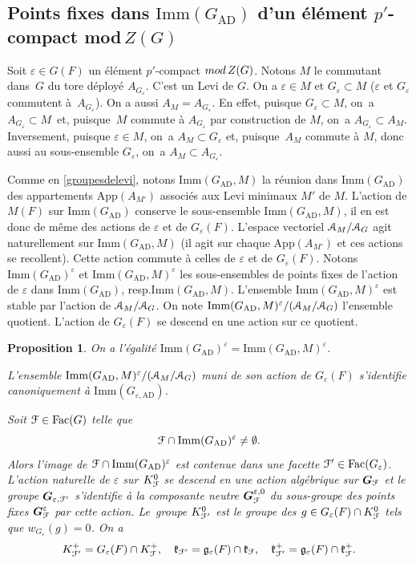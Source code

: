 \documentclass[11pt]{article}
\newcommand{\resp}{resp.\xspace}
\newcommand{\Subsection}{\subsection}
\newcommand{\skpt}{\smallskip}
\numberwithin{equation}{section}\providecommand{\og}{«\,}\providecommand{\fg}{\,»}
\let\mathcal \EuScript
\let\oldenumerate\enumerate
\renewcommand{\enumerate}{\oldenumerate\itemindent0pt}
\newenvironment{enumeratei}
{\bgroup\def\theenumi{\roman{enumi}}\def\theenumii{\arabic{enumii}}\oldenumerate}
{\endenumerate\egroup}
\let\epsilon\varepsilon
\newcommand{\rmod}{\textup{mod}\,}
\newcommand{\frg}{\mathfrak{g}}
\newcommand{\frk}{\mathfrak{k}}
\newcommand{\AD}{\mathrm{AD}}
\newcommand{\App}{\mathrm{App}}
\newcommand{\Fac}{\mathrm{Fac}}
\newcommand{\Imm}{\mathrm{Imm}}
\newcommand{\bG}{\boldsymbol{G}}
\newcommand{\cA}{\mathcal{A}}
\newcommand{\cF}{\mathcal{F}}
\theoremstyle{plain}
\newtheorem*{prop*}{Proposition}
\theoremstyle{definition}
\begin{document}
\Subsection{Points fixes dans \texorpdfstring{$\Imm(G_{\AD})$ d'un élément $p'$-compact mod\,$Z(G)$}{IGZG}}\label{pointsfixes}
Soit $\epsilon \in G(F)$ un élément $p'$-compact $\rmod Z(G)$. Notons $M$ le commutant dans~$G$ du tore déployé $A_{G_{\epsilon}}$. C'est un Levi de $G$. On a $\epsilon\in M$ et $G_{\epsilon}\subset M$ ($\epsilon$ et $G_{\epsilon}$ commutent à~$A_{G_{\epsilon}}$). On a aussi $A_{M}=A_{G_{\epsilon}}$. En effet, puisque $G_{\epsilon}\subset M$, on~a $ A_{G_{\epsilon}}\subset M$~et, puisque~$M$ commute à $A_{G_{\epsilon}}$ par construction de $M$, on~a $A_{G_{\epsilon}}\subset A_{M}$. Inversement, puisque $\epsilon\in M$, on~a $A_{M}\subset G_{\epsilon}$ et, puisque~$A_{M}$ commute à $M$, donc aussi au sous-ensemble $G_{\epsilon}$, on~a $A_{M}\subset A_{G_{\epsilon}}$.

Comme en \ref{groupesdelevi}, notons $\Imm(G_{\AD},M)$ la réunion dans $\Imm(G_{\AD})$ des appartements $\App(A_{M'})$ associés aux Levi minimaux $M'$ de $M$. L'action de $M(F)$ sur $\Imm(G_{\AD})$ conserve le sous-ensemble $\Imm(G_{\AD},M)$, il en est donc de même des actions de $\epsilon$ et de $G_{\epsilon}(F)$. L'espace vectoriel $\cA_{M} /\cA_{G}$ agit naturellement sur $\Imm(G_{\AD},M)$ (il agit sur chaque $\App(A_{M'})$ et ces actions se recollent). Cette action commute à celles de $\epsilon$ et de $G_{\epsilon}(F)$. Notons $\Imm(G_{\AD})^{\epsilon}$ et $\Imm(G_{\AD},M)^{\epsilon}$ les sous-ensembles de points fixes de l'action de $\epsilon$ dans $\Imm(G_{\AD})$, \resp $\Imm(G_{\AD},M)$. L'ensemble $\Imm(G_{\AD},M)^{\epsilon}$ est stable par l'action de $\cA_{M}/\cA_{G}$. On note $\Imm(G_{\AD},M)^{\epsilon}/(\cA_{M}/\cA_{G})$ l'ensemble quotient. L'action de $G_{\epsilon}(F)$ se descend en une action sur ce quotient.

\skpt
\begin{prop*}
\begin{enumeratei}
\item\label{pointsfixesi}
On a l'égalité $\Imm(G_{\AD})^{\epsilon}=\Imm(G_{\AD},M)^{\epsilon}$.

\item\label{pointsfixesii}
L'ensemble $\Imm(G_{\AD},M)^{\epsilon}/(\cA_{M}/\cA_{G})$ muni de son action de $G_{\epsilon}(F)$ s'identifie canoniquement à $\Imm(G_{\epsilon,\AD})$.

\item\label{pointsfixesiii}
Soit $\cF\in \Fac(G)$ telle que
\[
\cF\cap \Imm(G_{\AD})^{\epsilon}\neq\emptyset.
\]
Alors l'image de $\cF\cap \Imm(G_{\AD})^{\epsilon}$ est contenue dans une facette $\cF'\in \Fac(G_{\epsilon})$. L'action naturelle de $\epsilon$ sur $K_{\cF}^0$ se descend en une action algébrique sur $\bG_{\cF}$ et le groupe $\bG_{\epsilon,\cF'}$ s'identifie à la composante neutre $\bG_{\cF}^{\epsilon,0}$ du sous-groupe des points fixes $\bG_{\cF}^{\epsilon}$ par cette action. Le~groupe $K_{\cF'}^0$ est le groupe des $g\in G_{\epsilon}(F)\cap K_{\cF}^0$ tels que $w_{G_{\epsilon}}(g)=0$. On a
\[
K_{\cF'}^+=G_{\epsilon}(F)\cap K_{\cF}^+,\quad \frk_{\cF'}=\frg_{\epsilon}(F)\cap \frk_{\cF},\quad \frk_{\cF'}^+=\frg_{\epsilon}(F)\cap \frk_{\cF}^+.
\]
\end{enumeratei}
\end{prop*}
\end{document}
